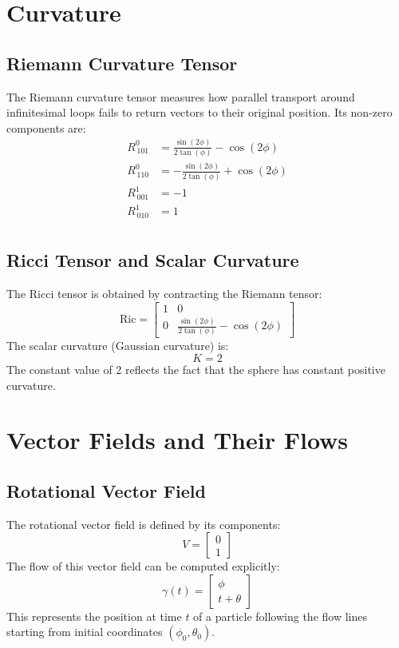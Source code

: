 \documentclass[12pt]{article}
\begin{document}
\section{Curvature}
\subsection{Riemann Curvature Tensor}
The Riemann curvature tensor measures how parallel transport around infinitesimal loops fails to return vectors to their original position. Its non-zero components are:
\[
\begin{aligned}
R^0_{\,101} &= \frac{\sin{\left(2 \phi \right)}}{2 \tan{\left(\phi \right)}} - \cos{\left(2 \phi \right)} \\
R^0_{\,110} &= - \frac{\sin{\left(2 \phi \right)}}{2 \tan{\left(\phi \right)}} + \cos{\left(2 \phi \right)} \\
R^1_{\,001} &= -1 \\
R^1_{\,010} &= 1 \\
\end{aligned}
\]

\subsection{Ricci Tensor and Scalar Curvature}
The Ricci tensor is obtained by contracting the Riemann tensor:
\[
\text{Ric} = \left[\begin{matrix}1 & 0\\0 & \frac{\sin{\left(2 \phi \right)}}{2 \tan{\left(\phi \right)}} - \cos{\left(2 \phi \right)}\end{matrix}\right]
\]
The scalar curvature (Gaussian curvature) is:
\[
K = 2
\]
The constant value of 2 reflects the fact that the sphere has constant positive curvature.

\section{Vector Fields and Their Flows}
\subsection{Rotational Vector Field}
The rotational vector field is defined by its components:
\[
V = \left[\begin{matrix}0\\1\end{matrix}\right]
\]
The flow of this vector field can be computed explicitly:
\[
\gamma(t) = \left[\begin{matrix}\phi\\t + \theta\end{matrix}\right]
\]
This represents the position at time $t$ of a particle following the flow lines starting from initial coordinates $(\phi_0, \theta_0)$.
\end{document}
